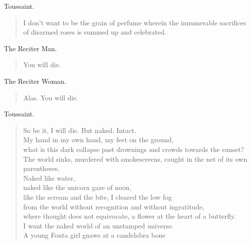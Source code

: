 \documentclass[letterpaper,article,12pt,oneside,notitlepage]{memoir}
\begin{document}
\begin{center}Toussaint.\end{center}

\begin{verse}
\indent I don't want to be the grain of perfume wherein the innumerable sacrifices of disarmed roses is summed up and celebrated. \\
\end{verse}

\begin{center}The Reciter Man.\end{center}

\begin{verse}
\hspace{1cm} You will die. \\
\end{verse}

\begin{center}The Reciter Woman.\end{center}

\begin{verse}
\hspace{1cm} Alas. You will die. \\
\end{verse}

\begin{center}Toussaint.\end{center}

\begin{verse}
\hspace{1cm} So be it, I will die. But naked. Intact. \\
My hand in my own hand, my feet on the ground, \\
what is this dark collapse past drownings and crowds towards the sunset? The world sinks, murdered with smokescreens, caught in the net of its own parentheses. \\
Naked like water, \\
naked like the unicorn gaze of noon, \\
like the scream and the bite, I cleared the low fog \\
from the world without recognition and without ingratitude, \\
where thought does not equivocate, a flower at the heart of a butterfly. \\
I want the naked world of an unstamped universe. \\
A young Fouta girl gnaws at a candelabra bone \\
\end{verse}
\end{document}
